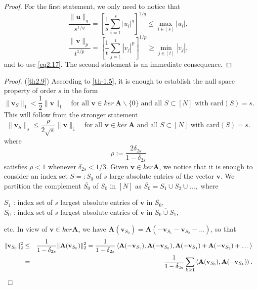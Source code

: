 \begin{proof}
    For the first statement, we only need to notice that
    \[
        \frac{\|\mathbf{u}\|_q}{s^{1/q}} = \left[ \frac{1}{s}\sum\limits_{i=1}^s \left|u_i\right|^q \right]^{1/q} \leq \max\limits_{i \in [s]}\left|u_i\right|,
    \]
    \[
        \frac{\|\mathbf{v}\|_p}{t^{1/p}} = \left[ \frac{1}{t} \sum\limits_{j=1}^t \left|v_j\right|^p \right]^{1/p} \geq \min\limits_{j \in [t]} \left|v_{j}\right|,
    \]
    and to use \cref{eq2.17}. The second statement is an immediate consequence.
\end{proof}



\begin{proof} {(\cref{th2.9})}
    According to \cref{th-1.5}, it is enough to establish the null space property of order $s$ in the form
    \[
        \|\mathbf{v}_S\|_1 < \frac{1}{2}\|\mathbf{v}\|_1 \quad \text{for all } \mathbf{v} \in ker\ \mathbf{A} \backslash \{0\} \text{ and all } S\subset [N] \text{ with card}(S)=s.
    \]
    This will follow from the stronger statement
    \[
        \|\mathbf{v}_S\|_s \leq \frac{\rho}{2 \sqrt{s}}\|\mathbf{v}\|_1 \quad \text{for all } \mathbf{v} \in ker\ \mathbf{A} \text{ and all } S\subset [N] \text{ with card}(S)=s.
    \]
    where
    \[
        \rho := \frac{2 \delta_{2s}}{1- \delta_{2s}}
    \]
    satisfies $\rho<1$ whenever $\delta_{2s} < 1/3$. Given $\mathbf{v} \in ker\mathbf{A}$, we notice that it is enough to consider an index set $S =: S_0$ of $s$ large absolute entries of the vector $\mathbf{v}$. We partition the complement $\overline{S_0}$ of $S_0$ in $[N]$ as $\overline{S_0} = S_1 \cup S_2 \cup \dots,$ where
    \begin{center}
        $S_1$ : index set of $s$ largest absolute entries of $\mathbf{v}$ in $\overline{S_0}$,\\
        $S_0$ : index set of $s$ largest absolute entries of $\mathbf{v}$ in $\overline{S_0 \cup S_1}$,
    \end{center}
    etc. In view of $\mathbf{v} \in ker\mathbf{A}$, we have $\mathbf{A}(\mathbf{v}_{S_0}) = \mathbf{A}(-\mathbf{v}_{S_1}-\mathbf{v}_{S_2}-\dots)$, so that 
    \begin{eqnarray}
        \|\mathbf{v}_{S_0}\|_2^2 &\leq& \frac{1}{1-\delta_{2s}} \|\mathbf{A}(\mathbf{v}_{S_0})\|_2^2 = \frac{1}{1-\delta_{2s}}\left<\mathbf{A}(-\mathbf{v}_{S_1}), \mathbf{A}(-\mathbf{v}_{S_0}), \mathbf{A}(-\mathbf{v}_{S_1}) + \mathbf{A}(-\mathbf{v}_{S_2})+\dots\right> \notag \\
        &=& \frac{1}{1-\delta_{2s}} \sum\limits_{k \geq 1}\left<\mathbf{A}(\mathbf{v}_{S_0}), \mathbf{A}(-\mathbf{v}_{S_k})\right>.

\end{eqnarray}
\end{proof}
